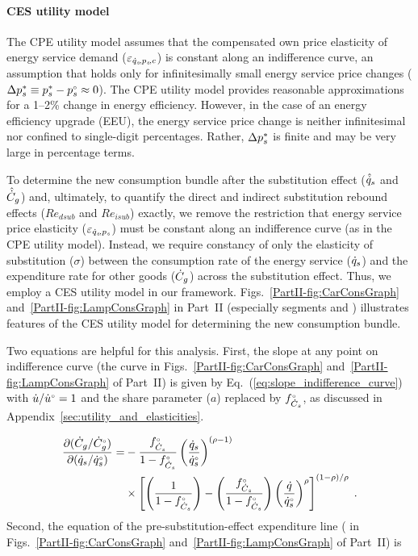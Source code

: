 \paragraph{CES utility model}
\label{sec:Resub_exact_method}

The CPE utility model assumes that 
the compensated own price elasticity of energy service demand ($\varepsilon_{\dot{q}_s\!,p_s\!,c}$) 
is constant along an indifference curve, an
assumption that holds only 
for infinitesimally small energy service price changes
($\Delta {p}^*_s \equiv {p}^*_s - {}{p}^{\scriptscriptstyle \circ}_s \approx 0$).
The CPE utility model provides
reasonable approximations for a 1--2\% change in energy efficiency.
However, in the case of an energy efficiency upgrade (EEU), 
the energy service price change is neither infinitesimal nor confined
to single-digit percentages.
Rather, 
$\Delta {p}^*_s$ is finite and may be very large in percentage terms.

To determine the new consumption bundle after the substitution effect 
($\hat{\dot{q}}_s$ and $\hat{\dot{C}}_g$)
and,
ultimately, to quantify the direct and indirect substitution rebound effects
($Re_{dsub}$ and $Re_{isub}$) exactly,
we remove the restriction that energy service price elasticity
($\varepsilon_{\dot{q}_s\!,p_s}$)
must be constant along an indifference curve 
(as in the CPE utility model).
Instead, we require constancy of only
the elasticity of substitution ($\sigma$) between
the consumption rate of the energy service ($\dot{q}_s$)
and the expenditure rate for other goods ($\dot{C}_g$)
across the substitution effect.
Thus, we employ a CES utility model in our framework.
Figs.~\ref{PartII-fig:CarConsGraph} 
and~\ref{PartII-fig:LampConsGraph} in Part~II
(especially segments \starc{} and \chat{})
illustrates features
of the CES utility model for determining the new consumption bundle.

Two equations are helpful for this analysis.
First, the slope at any point on indifference curve 
(the \iicirc{} curve in 
Figs.~\ref{PartII-fig:CarConsGraph} 
and~\ref{PartII-fig:LampConsGraph}
of Part~II)
is given by Eq.~(\ref{eq:slope_indifference_curve}) with 
$\dot{u}/{}{\dot{u}}^{\scriptscriptstyle \circ} = 1$ and 
the share parameter ($a$) replaced by ${}{f}^{\scriptscriptstyle \circ}_{\dot{C}_s}$,
as discussed in Appendix~\ref{sec:utility_and_elasticities}.

\begin{align} \label{eq:slope_indifference_curve_u1}
  \frac{\partial (\dot{C}_g/{}{\dot{C}}^{\scriptscriptstyle \circ}_g)}{\partial (\dot{q}_s/{}{\dot{q}}^{\scriptscriptstyle \circ}_s)} =&
        -\frac{{}{f}^{\scriptscriptstyle \circ}_{\dot{C}_s}}{1 - {}{f}^{\scriptscriptstyle \circ}_{\dot{C}_s}} \left( \frac{\dot{q}_s}{{}{\dot{q}}^{\scriptscriptstyle \circ}_s} \right)^{(\rho -1)} \nonumber  \\
        &\times \left[ \left( \frac{1}{1 - {}{f}^{\scriptscriptstyle \circ}_{\dot{C}_s}} \right) 
                - \left( \frac{{}{f}^{\scriptscriptstyle \circ}_{\dot{C}_s}}{1 - {}{f}^{\scriptscriptstyle \circ}_{\dot{C}_s}} \right) 
                          \left( \frac{\dot{q}}{{}{\dot{q}}^{\scriptscriptstyle \circ}_s} \right)^\rho \right]^{(1 - \rho)/\rho} \; .
\end{align}
%
Second, the equation of the pre-substitution-effect expenditure line 
(\starstar{} in 
Figs.~\ref{PartII-fig:CarConsGraph} 
and~\ref{PartII-fig:LampConsGraph}
of Part~II) is

